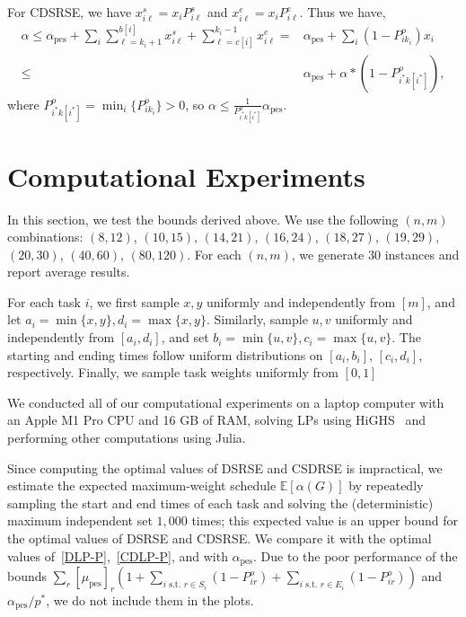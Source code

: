 \documentclass[final,5p,times,twocolumn]{elsarticle}
\newcommand{\E}{\mathbb{E}}
\DeclareMathOperator{\pes}{pes}
\begin{document}
For CDSRSE, we have 
$x_{i\ell}^{s}=x_i P_{i\ell}^s $ and $x_{i\ell}^{e}=x_i P_{i\ell}^e$.
Thus we have,
\begin{align*}
\alpha\leq \alpha_{\pes}+\sum_{i}\sum_{\ell=k_i+1}^{b[i]}x_{i\ell}^{s}+\sum_{\ell=c[i]}^{k_i-1}x_{i\ell}^{e} = &\alpha_{\pes}+\sum_{i}(1-P_{ik_i}^o)x_i\\
\leq &\alpha_{\pes}+\alpha*(1-P_{i^*k[i^*]}^{o}),
\end{align*}
where $P_{i^*k[i^*]}^{o}=\min_i \{P_{ik_i}^o\}>0$, so 
\(\alpha\leq \frac{1}{P_{i^*k[i^*]}^{o}}\alpha_{\pes}.\)

\section{Computational Experiments}

In this section, we test the bounds derived above.
We use the following $(n,m)$ combinations: $(8,12)$, $(10,15)$, $(14,21)$, $(16,24)$, $(18,27)$, $(19,29)$, $(20,30)$, $(40,60)$, $(80,120)$.
For each $(n,m)$, we generate $30$ instances and report average results.  

For each task $i$, we first sample $x,y$ uniformly and independently from $[m]$, and let $a_i=\min\{x,y\},d_i=\max\{x,y\}$.
Similarly, sample $u,v$ uniformly and independently from $[a_i,d_i]$, and set $b_i = \min\{u,v\}, c_i=\max\{u,v\}$.
The starting and ending times follow uniform distributions on $[a_i,b_i]$, $[c_i,d_i]$, respectively. Finally, we sample task weights uniformly from $[0, 1]$

We conducted all of our computational experiments on a laptop computer with an Apple M1 Pro CPU and 16 GB of RAM, solving LPs using HiGHS~\cite{HiGHS} and performing
other computations using Julia.

Since computing the optimal values of DSRSE and CSDRSE is impractical, we estimate the expected maximum-weight schedule $\E[\alpha(G)]$ by repeatedly sampling the start and end times of each task and solving the (deterministic) maximum independent set $1,000$ times; this expected value is an upper bound for the optimal values of DSRSE and CDSRSE.
We compare it with the optimal values of~\eqref{DLP-P},~\eqref{CDLP-P}, and with 
$\alpha_\pes$.
Due to the poor performance of the bounds $\sum_r [\mu_{\pes}]_r\left(1+\sum_{i\text{ s.t. }r\in S_i} (1-P_{ir}^o)+\sum_{i\text{ s.t. }r\in E_i} (1-P_{ir}^o)\right)$ and $\alpha_\pes/p^*$, we do not include them in the plots.
\end{document}
